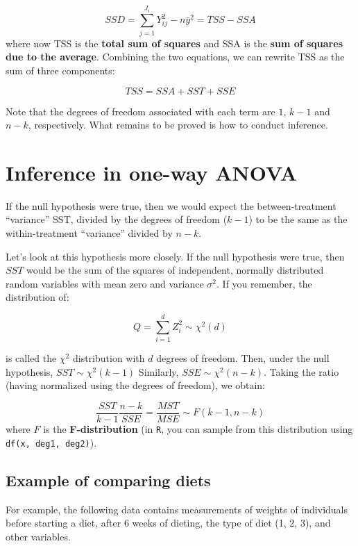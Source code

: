 \documentclass[
  letterpaper,
  DIV=11,
  numbers=noendperiod]{scrreprt}
\begin{document}
\[
SSD = \sum_{j = 1}^{J_{i}} Y_{ij}^2 - n \bar{y}^2 = TSS - SSA
\] where now TSS is the \textbf{total sum of squares} and SSA is the
\textbf{sum of squares due to the average}. Combining the two equations,
we can rewrite TSS as the sum of three components:

\[
TSS = SSA + SST + SSE
\]

Note that the degrees of freedom associated with each term are \(1\),
\(k-1\) and \(n-k\), respectively. What remains to be proved is how to
conduct inference.

\hypertarget{inference-in-one-way-anova}{%
\section{Inference in one-way ANOVA}\label{inference-in-one-way-anova}}

If the null hypothesis were true, then we would expect the
between-treatment ``variance'' SST, divided by the degrees of freedom
(\(k-1\)) to be the same as the within-treatment ``variance'' divided by
\(n-k\).

Let's look at this hypothesis more closely. If the null hypothesis were
true, then \(SST\) would be the sum of the squares of independent,
normally distributed random variables with mean zero and variance
\(\sigma^2\). If you remember, the distribution of:

\[
Q = \sum_{i=1}^d Z_i^2 \sim \chi^2(d)
\]

is called the \(\chi^2\) distribution with \(d\) degrees of freedom.
Then, under the null hypothesis, \(SST \sim \chi^2(k-1)\) Similarly,
\(SSE \sim \chi^2(n-k)\). Taking the ratio (having normalized using the
degrees of freedom), we obtain:

\[
\frac{SST}{k-1} \frac{n-k}{SSE} = \frac{MST}{MSE} \sim F(k-1, n-k)
\] where \(F\) is the \textbf{F-distribution} (in \texttt{R}, you can
sample from this distribution using \texttt{df(x,\ deg1,\ deg2)}).

\hypertarget{example-of-comparing-diets}{%
\subsection{Example of comparing
diets}\label{example-of-comparing-diets}}

For example, the following data contains measurements of weights of
individuals before starting a diet, after 6 weeks of dieting, the type
of diet (1, 2, 3), and other variables.
\end{document}
